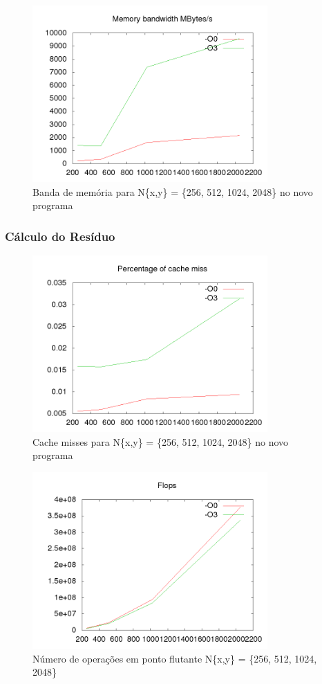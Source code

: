 \documentclass[12pt]{article}
\begin{document}
		\newpage
		\begin{figure}[ht!]
			\centering
			\includegraphics[width=90mm]{new_gs_mem.png}
			\caption{Banda de memória para N\{x,y\} = \{256, 512, 1024, 2048\} no novo programa}
		\end{figure}
		
		\newpage
		\subsubsection{Cálculo do Resíduo}
		\begin{figure}[ht!]
			\centering
			\includegraphics[width=90mm]{new_res_cache.png}
			\caption{Cache misses para N\{x,y\} = \{256, 512, 1024, 2048\} no novo programa}
		\end{figure}
		
		\begin{figure}[ht!]
			\centering
			\includegraphics[width=90mm]{new_res_flops.png}
			\caption{Número de operações em ponto flutante N\{x,y\} = \{256, 512, 1024, 2048\}}
		\end{figure}
		
\end{document}
